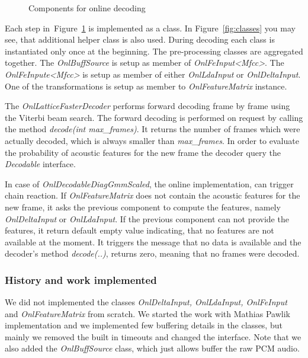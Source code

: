 \begin{figure}[!ph]
    \begin{center}
        
        \caption{Components for online decoding}
    \label{fig:online_pipeline} 
    \end{center}
\end{figure}

Each step in~Figure~\ref{fig:online_pipeline} is implemented as a class.
In Figure~\ref{fig:classes} you may see, that additional helper class is also used.
During decoding each class is instantiated only once at the beginning.
The pre-processing classes are aggregated together. 
The {\it OnlBuffSource}\/ is setup as member of {\it OnlFeInput<Mfcc>}\/.
The {\it OnlFeInpute<Mfcc>}\/ is setup as member of either {\it OnlLdaInput}\/ or {\it OnlDeltaInput}\/.
One of the transformations is setup as member to {\it OnlFeatureMatrix}\/ instance.

The {\it OnlLatticeFasterDecoder}\/ performs forward decoding frame by frame using the Viterbi beam search.
The forward decoding is performed on request by calling the method {\it decode(int max\_frames)}.
It returns the number of frames which were actually decoded, which is always smaller than {\it max\_frames}.
In order to evaluate the probability of acoustic features for the new frame
the decoder query the {\it Decodable}\/ interface.

In case of {\it OnlDecodableDiagGmmScaled}, the online implementation, can trigger chain reaction.
If {\it OnlFeatureMatrix}\/ does not contain the acoustic features for the new frame, it asks
the previous component to compute the features, namely {\it OnlDeltaInput}\/ or {\it OnlLdaInput}\/.
If the previous component can not provide the features, it return default empty value indicating,
that no features are not available at the moment. It triggers the message that no data is available
and the decoder's method {\it decode(..)}, returns zero, meaning that no frames were decoded.

\subsubsection{History and work implemented}
\label{ssub:history}
We did not implemented the classes {\it OnlDeltaInput, OnlLdaInput, OnlFeInput}\/ and {\it OnlFeatureMatrix}\/
from scratch. We started the work with Mathias Pawlik implementation and we implemented few buffering details
in the classes, but mainly we removed the built in timeouts and changed the interface.
Note that we also added the {\it OnlBuffSource}\/ class, which just allows buffer the raw \ac{PCM} audio.

